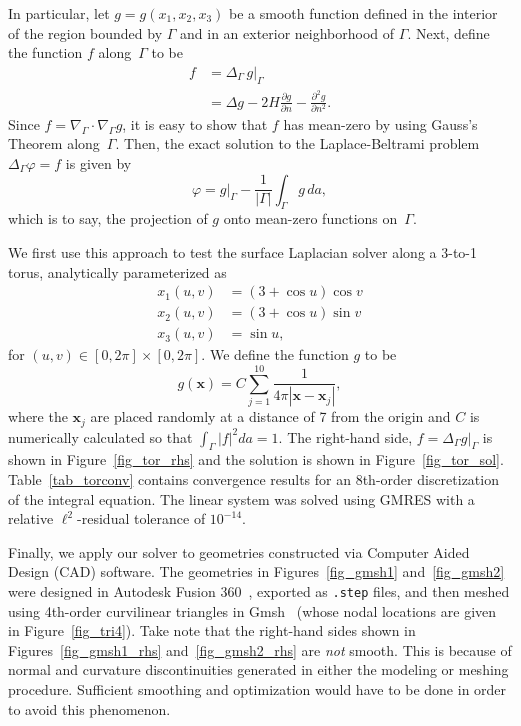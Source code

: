 \documentclass[11pt]{article}
\renewcommand{\phi}{\varphi}
\newcommand{\surfdiv}{\nabla_\Gamma \cdot}
\newcommand{\surfgrad}{\nabla_\Gamma}
\newcommand{\surflap}{\Delta_\Gamma}
\newcommand{\bx}{\bm x}
\numberwithin{equation}{section}
\begin{document}
In particular, let $g = g(x_1,x_2,x_3)$ be a
smooth function defined in the interior of the region bounded by
$\Gamma$ and in an exterior neighborhood of $\Gamma$. Next, define
the function $f$ along~$\Gamma$ to be
\begin{equation}\label{eq_f_rhs}
  \begin{aligned}
    f &= \surflap \, g\big|_\Gamma \\
    &= \Delta g - 2H\frac{\partial g}{\partial n} -
    \frac{\partial^2 g}{\partial n^2}.
  \end{aligned}
\end{equation}
Since $f = \surfdiv \surfgrad g$,
it is easy to show that $f$ has mean-zero by using Gauss's Theorem
along~$\Gamma$.
Then, the exact solution to the Laplace-Beltrami problem $\surflap
\phi = f$ is given by
\begin{equation}
  \phi = g\big|_\Gamma - \frac{1}{|\Gamma|} \int_\Gamma g \, da,
\end{equation}
which is to say, the projection of $g$ onto mean-zero functions
on~$\Gamma$.

We first use this approach to test the surface Laplacian solver along
a 3-to-1 torus, analytically parameterized as
\begin{equation}\label{eq_torus}
  \begin{aligned}
    x_1(u,v) &= (3 + \cos u) \cos v \\
    x_2(u,v) &= (3 + \cos u) \sin v \\
    x_3(u,v) &= \sin u,
  \end{aligned}
\end{equation}
for $(u,v) \in [0,2\pi] \times [0,2\pi]$. We define the function $g$
to be
\begin{equation}
  g(\bx) = C \sum_{j=1}^{10} \frac{1}{4\pi |\bx-\bx_j|},
\end{equation}
where the $\bx_j$ are placed randomly at a distance of 7 from the
origin and $C$ is numerically calculated so that $\int_\Gamma |f|^2 da
= 1$.
The right-hand side, $f = \surflap g\big|_\Gamma$ is shown in
Figure~\ref{fig_tor_rhs} and the solution is shown in
Figure~\ref{fig_tor_sol}. Table~\ref{tab_torconv} contains convergence
results for an 8th-order discretization of the integral equation.
The linear system was solved using GMRES
with a relative $\ell^2$-residual tolerance of $10^{-14}$.


Finally, we apply our solver to geometries constructed via Computer
Aided Design (CAD) software. The geometries in Figures~\ref{fig_gmsh1}
and~\ref{fig_gmsh2} were designed in Autodesk Fusion
360~\cite{autodesk_fusion}, exported as \texttt{.step} files, and then
meshed using 4th-order curvilinear triangles in Gmsh~\cite{gmsh}
(whose nodal locations are given in Figure~\ref{fig_tri4}). Take note
that the right-hand sides shown in Figures~\ref{fig_gmsh1_rhs}
and~\ref{fig_gmsh2_rhs} are
\emph{not} smooth. This is because of normal and curvature discontinuities
generated in either the modeling or meshing procedure. Sufficient
smoothing and optimization would have to be done in order to avoid
this phenomenon.
\end{document}
